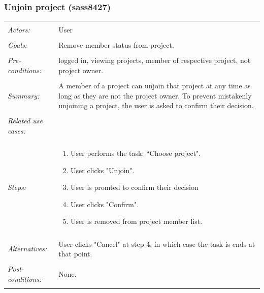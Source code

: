 \documentclass[11pt]{report}
\begin{document}
\subsubsection{Unjoin project (sass8427)}
\begin{tabular}{ p{2cm} p{12cm} }
 \hline
 \\
 \textit{Actors:} & User \\ 
 \\
 \textit{Goals:} & Remove member status from project. \\
 \\
 \textit{Pre-conditions:} & logged in, viewing projects, member of respective project, not project owner.  \\
\\
 \textit{Summary:} & A member of a project can unjoin that project at any time as long as they are not the project owner. To prevent mistakenly unjoining a project, the user is asked to confirm their decision.\\ 
 \\
 \textit{Related use cases:} & \\ 
 \\
 \textit{Steps:} & \begin{enumerate}
  \item User performs the task: ``Choose project".
  \item User clicks "Unjoin". 
  \item User is promted to confirm their decision
  \item User clicks "Confirm".
  \item User is removed from project member list.    
 \end{enumerate} \\
 \\
 \textit{Alternatives:} & User clicks "Cancel" at step 4, in which case the task is ends at that point. \\
 \\
 \textit{Post-conditions:} & None. \\
 \\
\hline
\end{tabular}
\end{document}
